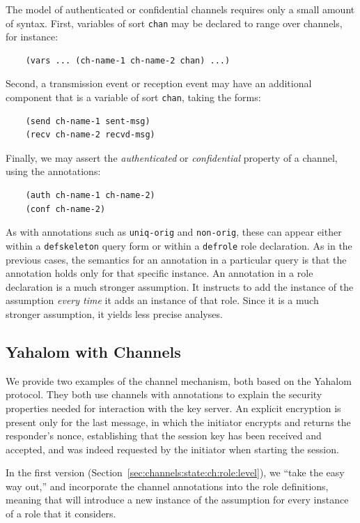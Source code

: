 The {\cpsa} model of authenticated or confidential channels requires
only a small amount of syntax.  First, variables of sort \verb|chan|
may be declared to range over channels, for instance:
%
\begin{verbatim}
    (vars ... (ch-name-1 ch-name-2 chan) ...)
\end{verbatim}
%
Second, a transmission event or reception event may have an additional
component that is a variable of sort \verb|chan|, taking the forms:  
%
\begin{verbatim}
    (send ch-name-1 sent-msg)
    (recv ch-name-2 recvd-msg) 
\end{verbatim}
%
Finally, we may assert the \emph{authenticated} or \emph{confidential}
property of a channel, using the annotations:
%
\begin{verbatim}
    (auth ch-name-1 ch-name-2)
    (conf ch-name-2) 
\end{verbatim}
%
As with annotations such as \verb|uniq-orig| and \verb|non-orig|,
these can appear either within a \verb|defskeleton| query form or
within a \verb|defrole| role declaration.  As in the previous cases,
the semantics for an annotation in a particular query is that the
annotation holds only for that specific instance.  An annotation in a
role declaration is a much stronger assumption.  It instructs {\cpsa}
to add the instance of the assumption \emph{every time} it adds an
instance of that role.  Since it is a much stronger assumption, it
yields less precise analyses.

\subsection{Yahalom with Channels}
\label{sec:channels:state:ch:yahalom}

We provide two examples of the channel mechanism, both based on the
Yahalom protocol.  They both use channels with annotations to explain
the security properties needed for interaction with the key server.
An explicit encryption is present only for the last message, in which
the initiator encrypts and returns the responder's nonce, establishing
that the session key has been received and accepted, and was indeed
requested by the initiator when starting the session.

In the first version (Section~\ref{sec:channels:state:ch:role:level}),
we ``take the easy way out,'' and incorporate the channel annotations
into the role definitions, meaning that {\cpsa} will introduce a new
instance of the assumption for every instance of a role that it
considers.

